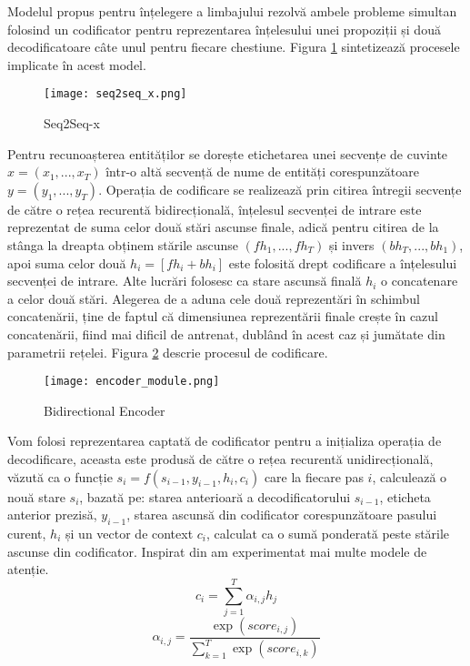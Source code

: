 Modelul propus pentru înțelegere a limbajului rezolvă ambele probleme simultan folosind un codificator pentru reprezentarea înțelesului unei propoziții și două decodificatoare câte unul pentru fiecare chestiune. Figura \ref{fig:seq2seq_x} sintetizează procesele implicate în acest model.

\begin{figure}[htbp]
	\centering
	\texttt{[image: seq2seq\_x.png]}
	\caption{Seq2Seq-x}
	\label{fig:seq2seq_x}
\end{figure}

Pentru recunoașterea entităților se dorește etichetarea unei secvențe de cuvinte $ x= (x_1, ..., x_T)$ într-o altă secvență de nume de entități corespunzătoare $ y=(y_1, ..., y_T) $. Operația de codificare se realizează prin citirea întregii secvențe de către o rețea recurentă bidirecțională, înțelesul secvenței de intrare este reprezentat de suma celor două stări ascunse finale, adică pentru citirea de la stânga la dreapta obținem stările ascunse $(fh_1, ..., fh_T)$ și invers $(bh_T, ..., bh_1)$, apoi suma celor două $h_i = [fh_i + bh_i]$ este folosită drept codificare a înțelesului secvenței de intrare. Alte lucrări \cite{joint_online_bing} folosesc ca stare ascunsă finală $h_i$ o concatenare a celor două stări. Alegerea de a aduna cele două reprezentări în schimbul concatenării, ține de faptul că dimensiunea reprezentării finale crește în cazul concatenării, fiind mai dificil de antrenat, dublând în acest caz și jumătate din parametrii rețelei. Figura \ref{fig:enc_module} descrie procesul de codificare.

\begin{figure}[h]
	\centering
	\texttt{[image: encoder\_module.png]}
	\caption{Bidirectional Encoder}
	\label{fig:enc_module}
\end{figure}

Vom folosi reprezentarea captată de codificator pentru a inițializa operația de decodificare, aceasta este produsă de către o rețea recurentă unidirecțională, văzută ca o funcție $s_i=f(s_{i-1}, y_{i-1}, h_i, c_i)$ care la fiecare pas $i$, calculează o nouă stare $s_i$, bazată pe: starea anterioară a decodificatorului $s_{i-1}$, eticheta anterior prezisă, $y_{i-1}$, starea ascunsă din codificator corespunzătoare pasului curent, $h_i$ și un vector de context $c_i$, calculat ca o sumă ponderată peste stările ascunse din codificator.
Inspirat din \cite{trans_luong_manning} am experimentat mai multe modele de atenție.
$$ c_i = \sum_{j=1}^{T} \alpha_{i,j} h_j$$
$$ \alpha_{i,j} = \frac{\exp(score_{i, j})}{\sum_{k=1}^{T} \exp(score_{i, k})}$$

